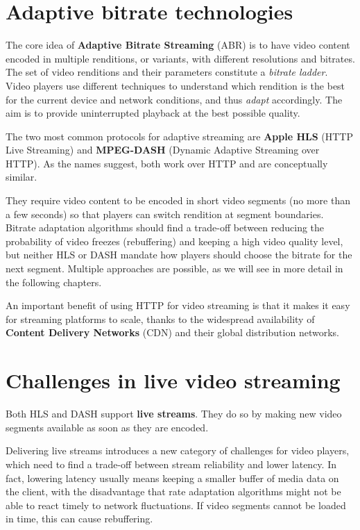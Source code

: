 \section{Adaptive bitrate technologies}
\label{sec:intro/technologies}

The core idea of \textbf{Adaptive Bitrate Streaming} (ABR) is to have video content encoded in multiple renditions, or variants, with different resolutions and bitrates. The set of video renditions and their parameters constitute a \textit{bitrate ladder}. Video players use different techniques to understand which rendition is the best for the current device and network conditions, and thus \textit{adapt} accordingly. The aim is to provide uninterrupted playback at the best possible quality.

The two most common protocols for adaptive streaming are \textbf{Apple HLS} (HTTP Live Streaming) and \textbf{MPEG-DASH} (Dynamic Adaptive Streaming over HTTP). As the names suggest, both work over HTTP and are conceptually similar.

They require video content to be encoded in short video segments (no more than a few seconds) so that players can switch rendition at segment boundaries. Bitrate adaptation algorithms should find a trade-off between reducing the probability of video freezes (rebuffering) and keeping a high video quality level, but neither HLS or DASH mandate how players should choose the bitrate for the next segment. Multiple approaches are possible, as we will see in more detail in the following chapters.

An important benefit of using HTTP for video streaming is that it makes it easy for streaming platforms to scale, thanks to the widespread availability of \textbf{Content Delivery Networks} (CDN) and their global distribution networks.

\section{Challenges in live video streaming}
\label{sec:intro/challenges}

Both HLS and DASH support \textbf{live streams}. They do so by making new video segments available as soon as they are encoded.

Delivering live streams introduces a new category of challenges for video players, which need to find a trade-off between stream reliability and lower latency. In fact, lowering latency usually means keeping a smaller buffer of media data on the client, with the disadvantage that rate adaptation algorithms might not be able to react timely to network fluctuations. If video segments cannot be loaded in time, this can cause rebuffering.

